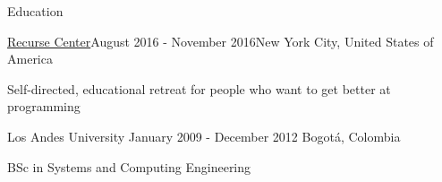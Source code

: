 \documentclass{resume} %
\def\uniandes{Los Andes University }
\begin{document}
\begin{rSection}{Education}

\begin{rSubsection}{\href{https://www.recurse.com/about}{Recurse Center}}{August 2016 - November 2016}{New York City, United States of America}
\item Self-directed, educational retreat for people who want to get better at programming
\end{rSubsection}

\begin{rSubsection}{\uniandes}{January 2009 - December 2012} {Bogot\'a, Colombia}
\item BSc in Systems and Computing Engineering  
\end{rSubsection}

\end{rSection}


\end{document}
